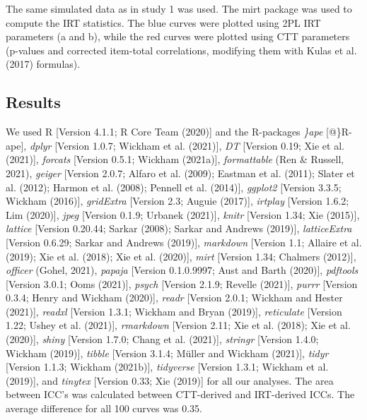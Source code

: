 \documentclass[
  english,
  man]{apa6}
\begin{document}
The same simulated data as in study 1 was used. The mirt package was used to compute the IRT statistics. The blue curves were plotted using 2PL IRT parameters (a and b), while the red curves were plotted using CTT parameters (p-values and corrected item-total correlations, modifying them with Kulas et al. (2017) formulas).

\hypertarget{results-1}{%
\subsection{Results}\label{results-1}}

We used R {[}Version 4.1.1; R Core Team (2020){]} and the R-packages \emph{\}ape} {[}@\}R-ape{]}, \emph{dplyr} {[}Version 1.0.7; Wickham et al. (2021){]}, \emph{DT} {[}Version 0.19; Xie et al. (2021){]}, \emph{forcats} {[}Version 0.5.1; Wickham (2021a){]}, \emph{formattable} (Ren \& Russell, 2021), \emph{geiger} {[}Version 2.0.7; Alfaro et al. (2009); Eastman et al. (2011); Slater et al. (2012); Harmon et al. (2008); Pennell et al. (2014){]}, \emph{ggplot2} {[}Version 3.3.5; Wickham (2016){]}, \emph{gridExtra} {[}Version 2.3; Auguie (2017){]}, \emph{irtplay} {[}Version 1.6.2; Lim (2020){]}, \emph{jpeg} {[}Version 0.1.9; Urbanek (2021){]}, \emph{knitr} {[}Version 1.34; Xie (2015){]}, \emph{lattice} {[}Version 0.20.44; Sarkar (2008); Sarkar and Andrews (2019){]}, \emph{latticeExtra} {[}Version 0.6.29; Sarkar and Andrews (2019){]}, \emph{markdown} {[}Version 1.1; Allaire et al. (2019); Xie et al. (2018); Xie et al. (2020){]}, \emph{mirt} {[}Version 1.34; Chalmers (2012){]}, \emph{officer} (Gohel, 2021), \emph{papaja} {[}Version 0.1.0.9997; Aust and Barth (2020){]}, \emph{pdftools} {[}Version 3.0.1; Ooms (2021){]}, \emph{psych} {[}Version 2.1.9; Revelle (2021){]}, \emph{purrr} {[}Version 0.3.4; Henry and Wickham (2020){]}, \emph{readr} {[}Version 2.0.1; Wickham and Hester (2021){]}, \emph{readxl} {[}Version 1.3.1; Wickham and Bryan (2019){]}, \emph{reticulate} {[}Version 1.22; Ushey et al. (2021){]}, \emph{rmarkdown} {[}Version 2.11; Xie et al. (2018); Xie et al. (2020){]}, \emph{shiny} {[}Version 1.7.0; Chang et al. (2021){]}, \emph{stringr} {[}Version 1.4.0; Wickham (2019){]}, \emph{tibble} {[}Version 3.1.4; Müller and Wickham (2021){]}, \emph{tidyr} {[}Version 1.1.3; Wickham (2021b){]}, \emph{tidyverse} {[}Version 1.3.1; Wickham et al. (2019){]}, and \emph{tinytex} {[}Version 0.33; Xie (2019){]} for all our analyses. The area between ICC's was calculated between CTT-derived and IRT-derived ICCs. The average difference for all 100 curves was 0.35.
\end{document}
